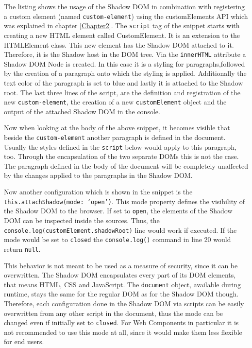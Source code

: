 The listing shows the usage of the Shadow DOM in combination with registering a custom element (named \texttt{custom-element}) using the customElements API which was explained in chapter \ref{Chapter2}.
The \texttt{script} tag of the snippet starts with creating a new HTML element called CustomElement. It is an extension to the HTMLElement class. This new element has the Shadow DOM attached to it. Therefore, it is the Shadow host in the DOM tree. Via the \texttt{innerHTML} attribute a Shadow DOM Node is created. In this case it is a styling for paragraphs,followed by the creation of a paragraph onto which the styling is applied. Additionally the text color of the paragraph is set to blue and lastly it is attached to the Shadow root.
The last three lines of the script, are the definition and registration of the new \texttt{custom-element}, the creation of a new \texttt{customElement} object and the output of the attached Shadow DOM in the console.

Now when looking at the body of the above snippet, it becomes visible that beside the \texttt{custom-element} another paragraph is defined in the document. Usually the styles defined in the \texttt{script} below would apply to this paragraph, too. Through the encapsulation of the two separate DOMs this is not the case. The paragraph defined in the body of the document will be completely unaffected by the changes applied to the paragraphs in the Shadow DOM.\cite{simon_thesis}

Now another configuration which is shown in the snippet is the \texttt{this.attachShadow({mode: 'open'})}. This mode property defines the visibility of the Shadow DOM to the browser. If set to \texttt{open}, the elements of the Shadow DOM can be inspected inside the sources. Thus, the \texttt{console.log(customElement.shadowRoot)} line would work if executed. 
If the mode would be set to \texttt{closed}  the \texttt{console.log()} command in line 20 would return \texttt{null}.\cite{simon_thesis}

This behavior is not meant to be used as a measure of security, since it can be overwritten. The Shadow DOM encapsulates every part of its DOM elements, that means HTML, CSS and JavaScript. The \texttt{document} object, available during runtime, stays the same for the regular DOM as for the Shadow DOM though. Therefore, each configuration done in the Shadow DOM via scripts can be easily overwritten from any other script in the document, thus the mode can be changed even if initially set to \texttt{closed}.\cite{shadow_dom_encapsulation} For Web Components in particular it is not recommended to use this mode at all, since it would make them less flexible for end users.\cite{wc_shadow_dom_google}

